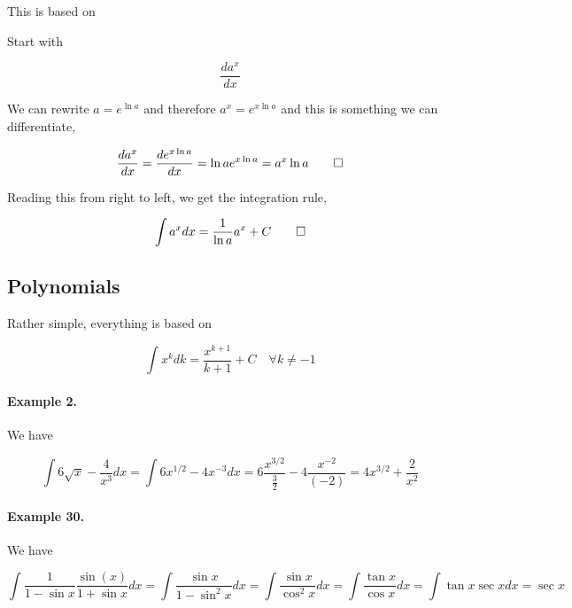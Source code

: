 
This is based on 

Start with

\begin{equation*}
    \frac{d a^x}{dx}
\end{equation*}

We can rewrite $a = e^{\ln a}$ and therefore $a^x = e^{x \ln a}$ and this is something we can differentiate,

\begin{equation*}
    \frac{d a^x}{dx} = \frac{d e^{x \ln a} }{dx} = \ln a e^{x \ln a} = a^x \ln a \qed
\end{equation*}

Reading this from right to left, we get the integration rule,

\begin{equation*}
    \int a^x dx = \frac{1}{\ln a} a^x + C \qed
\end{equation*}


\subsection{Polynomials}

Rather simple, everything is based on

\begin{equation*}
    \int x^k dk = \frac{x^{k+1}}{k+1} + C \quad \forall k \neq -1
\end{equation*}

\paragraph{Example 2.} We have

\begin{equation*}
    \int 6 \sqrt{x} - \frac{4}{x^3} dx = \int 6 x^{1/2} - 4 x^{-3} dx = 6 \frac{x^{3/2}}{\frac{3}{2}} - 4 \frac{x^{-2}}{(-2)} = 4 x^{3/2} + \frac{2}{x^2}
\end{equation*}

\paragraph{Example 30.} We have

\begin{equation*}
    \int \frac{1}{1 - \sin x} \frac{\sin(x)}{1 + \sin x} dx = \int \frac{\sin x}{1 - \sin^2 x} dx = \int \frac{\sin x}{\cos^2 x} dx = \int \frac{\tan x}{\cos x} dx = \int \tan x \sec x dx = \sec x
\end{equation*}

